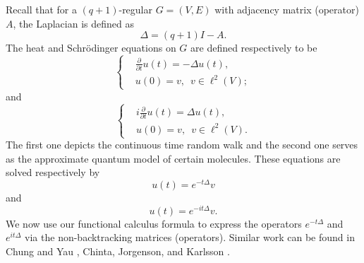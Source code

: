 \documentclass{article}
\begin{document}
Recall that for a $(q+1)$-regular $G=(V,E)$ with adjacency matrix (operator) $A$, the Laplacian is defined as $$\Delta=(q+1)I-A.$$ The heat and Schr\"odinger equations on $G$ are defined respectively to be
$$\left\{
\begin{aligned}
    &\frac{\partial}{\partial t}u(t)=-\Delta u(t),\\
    &u(0)=v,\,\,\,v \in \ell^2(V);
\end{aligned} \right.$$ 
and 
$$\left\{
\begin{aligned}
    &i \frac{\partial}{\partial t}u(t)=\Delta u(t),\\
    &u(0)=v,\,\,\,v \in \ell^2(V).
\end{aligned} \right.$$ 
The first one depicts the continuous time random walk and the second one serves as the approximate quantum model of certain molecules. These equations are solved respectively by 
$$u(t)=e^{-t\Delta}v$$
and 
$$u(t)=e^{-it\Delta}v.$$
 We now use our functional calculus formula to express the operators $e^{-t\Delta}$ and $e^{it\Delta}$ via the non-backtracking matrices (operators). Similar work can be found in Chung and Yau \cite{CY99}, Chinta, Jorgenson, and Karlsson \cite{CJK15}.
\end{document}
